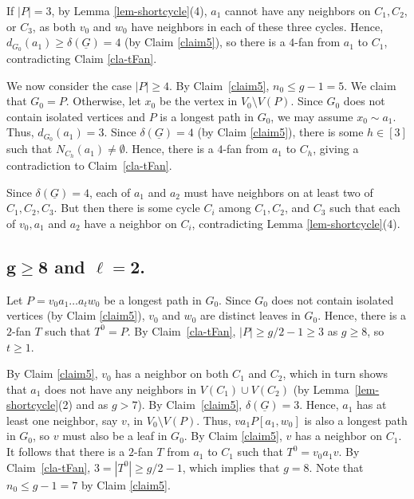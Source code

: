\documentclass[12pt,oneside]{amsart}
\begin{document}
If $|P|=3$, by Lemma \ref{lem-shortcycle}(4), $a_1$ cannot have any neighbors on $C_1, C_2$, or $C_3$, as both $v_0$ and $w_0$ have neighbors in each of these three cycles. Hence, $d_{G_0}(a_1) \ge \delta(\underline{G}) = 4$ (by Claim \ref{claim5}), so  there is a $4$-fan  from $a_1$ to $C_1$, contradicting Claim \ref{cla-tFan}.

We now consider the case $|P|\geq 4$. By Claim~\ref{claim5}, $n_0\le g-1 =5$. We claim that $G_0 = P$. Otherwise, let $x_0$ be the vertex in $V_0\setminus V(P)$. Since $G_0$ does not contain isolated vertices and $P$ is a longest path in $G_0$, we may assume $x_0\sim a_1$. Thus, $d_{G_0}(a_1) =3$. Since $\delta(\underline{G}) =4$ (by Claim \ref{claim5}), there is some $h\in [3]$ such that $N_{C_h}(a_1) \ne \emptyset$.
Hence, there is a $4$-fan from $a_1$ to $C_h$, giving a contradiction to Claim~\ref{cla-tFan}.

Since  $\delta(\underline{G}) = 4$, each of $a_1$ and $a_2$ must have neighbors on at least two of $C_1, C_2, C_3$. But then there is some cycle $C_i$ among $C_1, C_2$, and $C_3$ such that each of $v_0, a_1$ and $a_2$ have a neighbor on $C_i$, contradicting Lemma \ref{lem-shortcycle}(4).

\subsection{\texorpdfstring{${\mathbf{g\ge 8}}$}{ggeq8} and \texorpdfstring{$\mathbf{\ell= 2}$}{l=2}.} Let $P=v_0a_1\ldots a_tw_0$ be a longest path in $G_0$.  Since $G_0$ does not contain isolated vertices (by Claim \ref{claim5}), $v_0$ and $w_0$ are distinct leaves in $G_0$. Hence, there is a $2$-fan $T$ such that $T^0=P$.  By Claim~\ref{cla-tFan},   $|P| \ge g/2 -1 \ge 3$ as $g\ge 8$, so $t\geq 1$.

By Claim \ref{claim5}, $v_0$ has a neighbor on both $C_1$ and $C_2$, which in turn shows that  $a_1$ does not have any neighbors in $V(C_1)\cup V(C_2)$ (by Lemma~\ref{lem-shortcycle}(2) and as $g>7$).
By Claim~\ref{claim5},
$\delta(\underline{G})=3$. Hence, $a_1$ has at least one neighbor, say $v$, in $V_0\setminus V(P)$. Thus, $va_1P[a_1, w_0]$ is also a longest path in $G_0$, so $v$ must also be a leaf in $G_0$.
By Claim \ref{claim5},
$v$ has a neighbor on $C_1$. It follows that there is a $2$-fan $T$ from $a_1$ to $C_1$ such that $T^0=v_0a_1v$. By Claim~\ref{cla-tFan}, $3=|T^0|\ge g/2-1$, which implies that  $g=8$. Note that $n_0\leq g-1=7$ by Claim \ref{claim5}.
\end{document}
